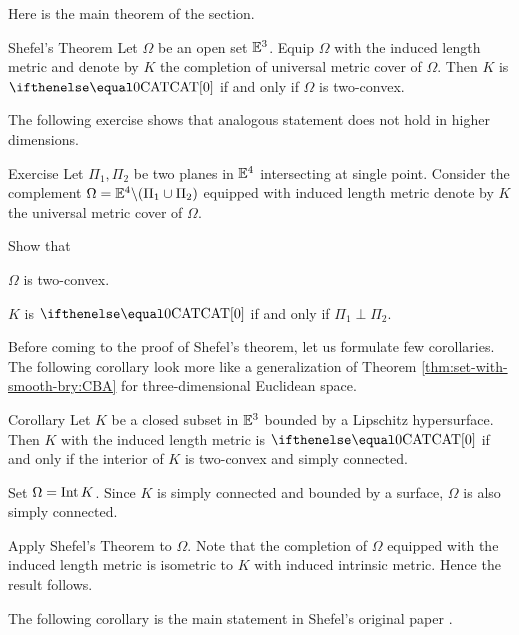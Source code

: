 Here is the main theorem of the section.

\begin{thm}{Shefel's Theorem}\label{thm:shefel}
Let $\Omega$ be an open set $\mathbb{E}^3$.
Equip $\Omega$ with the induced length metric
and denote by $K$ the completion of universal metric cover of $\Omega$.
Then $K$ is $\CAT0$ 
if and only if $\Omega$ is two-convex.
\end{thm}

The following exercise shows that analogous statement does not hold in higher dimensions.

\begin{thm}{Exercise}\label{ex:two-planes}
Let $\Pi_1,\Pi_2$ be two planes in $\mathbb{E}^4$ intersecting at single point.
Consider the complement $\Omega=\EE^4\backslash(\Pi_1\cup\Pi_2)$
equipped with induced length metric
denote by $K$ the universal metric cover of $\Omega$.

Show that 

\begin{subthm}{}
$\Omega$ is two-convex.
\end{subthm}

\begin{subthm}{}
$K$ is $\CAT0$ if and only if $\Pi_1\perp\Pi_2$.
\end{subthm}
\end{thm}

Before coming to the proof of Shefel's theorem, 
let us formulate few corollaries.
The following corollary look more like a generalization of Theorem \ref{thm:set-with-smooth-bry:CBA} for three-dimensional Euclidean space.

\begin{thm}{Corollary}\label{cor:shefel}
Let $K$ be a closed subset in $\mathbb{E}^3$ 
bounded by a Lipschitz hypersurface.
Then $K$ with the induced length metric is $\CAT0$  
if and only if the interior of $K$ is two-convex and simply connected.
\end{thm}

Set $\Omega=\mathop{\rm Int}\nolimits K$.
Since $K$ is simply connected and bounded by a surface, 
$\Omega$ is also simply connected.

Apply Shefel's Theorem to $\Omega$.
Note that the completion of $\Omega$ equipped with the induced length metric 
is isometric to $K$ with induced intrinsic metric.
Hence the result follows.
\qeds

The following corollary is the main statement in Shefel's original paper \cite{shefel-3D}.

